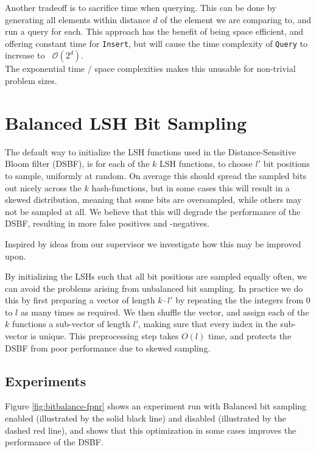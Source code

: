 \documentclass[a4paper,11pt]{article}
\newcommand{\BigO}[1]{\ensuremath{\mathop{}\mathopen{}\mathcal{O}\mathopen{}\left(#1\right)}}
\begin{document}
Another tradeoff is to sacrifice time when querying. This can be done by generating all elements within distance $d$ of the element we are comparing to, and run a query for each. This approach has the benefit of being space efficient, and offering constant time for \texttt{Insert}, but will cause the time complexity of \texttt{Query} to increase to \BigO{2^d}.\\

The exponential time / space complexities makes this unusable for non-trivial problem sizes.

\section{Balanced LSH Bit Sampling} \label{sec:balanced}

The default way to initialize the LSH functions used in the Distance-Sensitive Bloom filter (DSBF), is for each of the $k$ LSH functions, to choose $l'$ bit positions to sample, uniformly at random. On average this should spread the sampled bits out nicely across the $k$ hash-functions, but in some cases this will result in a skewed distribution, meaning that some bits are oversampled, while others may not be sampled at all. We believe that this will degrade the performance of the DSBF, resulting in more false positives and -negatives.

Inspired by ideas from our supervisor we investigate how this may be improved upon.

By initializing the LSHs such that all bit positions are sampled equally often, we can avoid the problems arising from unbalanced bit sampling.
In practice we do this by first preparing a vector of length $k \cdot l'$ by repeating the the integers from 0 to $l$ as many times as required. We then shuffle the vector, and assign each of the $k$ functions a sub-vector of length $l'$, making sure that every index in the sub-vector is unique. This preprocessing step takes $O(l)$ time, and protects the DSBF from poor performance due to skewed sampling.

\subsection{Experiments}
Figure \ref{fig:bitbalance-fpnr} shows an experiment run with Balanced bit sampling enabled (illustrated by the solid black line) and disabled (illustrated by the dashed red line), and shows that this optimization in some cases improves the performance of the DSBF.
\end{document}
